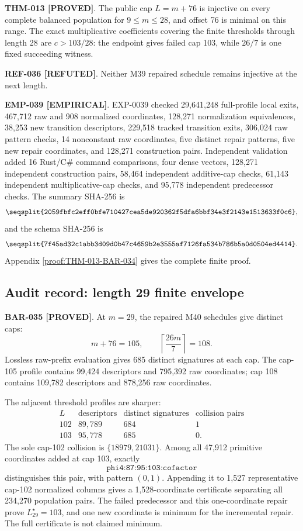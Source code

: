 \documentclass[11pt]{article}
\newcommand{\claimstatus}[2]{\textbf{#1 [#2]}}
\begin{document}
\claimstatus{THM-013}{PROVED}. The public cap \(L=m+76\) is injective on
every complete balanced population for \(9\le m\le28\), and offset 76 is
minimal on this range. The exact multiplicative coefficients covering the
finite thresholds through length 28 are \(c>103/28\): the endpoint gives
failed cap 103, while \(26/7\) is one fixed succeeding witness.

\claimstatus{REF-036}{REFUTED}. Neither M39 repaired schedule remains
injective at the next length.

\claimstatus{EMP-039}{EMPIRICAL}. EXP-0039 checked 29,641,248 full-profile
local exits, 467,712 raw and 908 normalized coordinates, 128,271
normalization equivalences, 38,253 new transition descriptors, 229,518
tracked transition exits, 306,024 raw pattern checks, 14 nonconstant raw
coordinates, five distinct repair patterns, five new repair coordinates,
and 128,271 construction pairs. Independent validation added 16 Rust/C\#
command comparisons, four dense vectors, 128,271 independent construction
pairs, 58,464 independent additive-cap checks, 61,143 independent
multiplicative-cap checks, and 95,778 independent predecessor checks. The
summary SHA-256 is
\[
\texttt{\seqsplit{2059fbfc2eff0bfe710427cea5de920362f5dfa6bbf34e3f2143e1513633f0c6}},
\]
and the schema SHA-256 is
\[
\texttt{\seqsplit{7f45ad32c1abb3d09d0b47c4659b2e3555af7126fa534b786b5a0d0504ed4414}}.
\]
Appendix \ref{proof:THM-013-BAR-034} gives the complete finite proof.

\subsection{Audit record: length 29 finite envelope}

\claimstatus{BAR-035}{PROVED}. At \(m=29\), the repaired M40 schedules give
distinct caps:
\[
m+76=105,\qquad
\left\lceil\frac{26m}{7}\right\rceil=108.
\]
Lossless raw-prefix evaluation gives 685 distinct signatures at each cap.
The cap-105 profile contains 99,424 descriptors and 795,392 raw
coordinates; cap 108 contains 109,782 descriptors and 878,256 raw
coordinates.

The adjacent threshold profiles are sharper:
\[
\begin{array}{c|r|r|r}
L&\text{descriptors}&\text{distinct signatures}&\text{collision pairs}\\
\hline
102&89{,}789&684&1\\
103&95{,}778&685&0.
\end{array}
\]
The sole cap-102 collision is \(\{18979,21031\}\). Among all 47,912
primitive coordinates added at cap 103, exactly
\[
\texttt{phi4:87:95:103:cofactor}
\]
distinguishes this pair, with pattern \((0,1)\). Appending it to 1,527
representative cap-102 normalized columns gives a 1,528-coordinate
certificate separating all 234,270 population pairs. The failed predecessor
and this one-coordinate repair prove \(L_{29}^{\star}=103\), and one new
coordinate is minimum for the incremental repair. The full certificate is
not claimed minimum.
\end{document}
